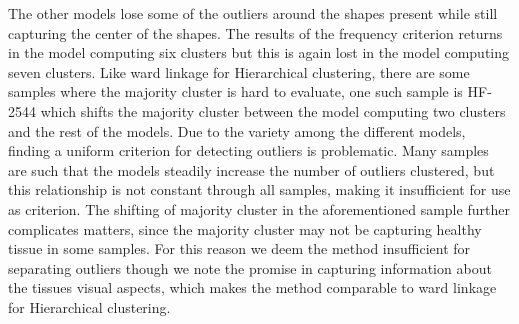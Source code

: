 The other models lose some of the outliers around the shapes present while still capturing the center of the shapes. The results of the frequency criterion returns in the model computing six clusters but this is again lost in the model computing seven clusters. Like ward linkage for Hierarchical clustering, there are some samples where the majority cluster is hard to evaluate, one such sample is HF-2544 which shifts the majority cluster between the model computing two clusters and the rest of the models. Due to the variety among the different models, finding a uniform criterion for detecting outliers is problematic. Many samples are such that the models steadily increase the number of outliers clustered, but this relationship is not constant through all samples, making it insufficient for use as criterion. The shifting of majority cluster in the aforementioned sample further complicates matters, since the majority cluster may not be capturing healthy tissue in some samples. For this reason we deem the method insufficient for separating outliers though we note the promise in capturing information about the tissues visual aspects, which makes the method comparable to ward linkage for Hierarchical clustering.

